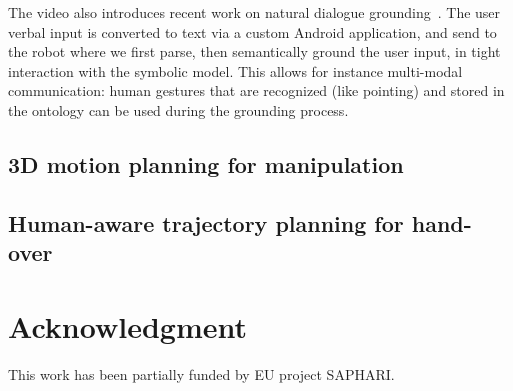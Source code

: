\documentclass[conference]{IEEEtran}
\begin{document}
The video also introduces recent work on natural dialogue
grounding~\cite{Lemaignan2011a}. The user verbal input is converted to text via
a custom Android application, and send to the robot where we first parse, then
semantically ground the user input, in tight interaction with the symbolic
model. This allows for instance multi-modal communication: human gestures that
are recognized (like pointing) and stored in the ontology can be used during
the grounding process.

\subsection{3D motion planning for manipulation}

\subsection{Human-aware trajectory planning for hand-over}

\section*{Acknowledgment}

This work has been partially funded by EU project SAPHARI.




\end{document}
